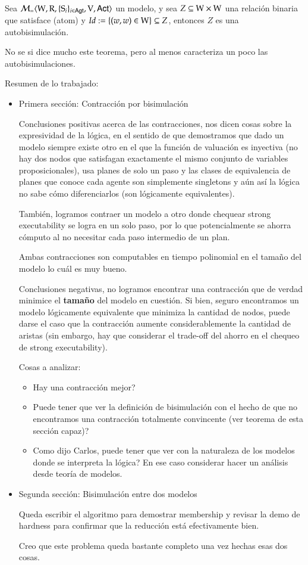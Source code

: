 \begin{teorema}
    Sea $\mathcal{M}_=\langle \mathrm{W},\mathrm{R},\{ \mathrm{S}_i \}_{i \in {\rm \sf Agt}},\mathrm{V},{\rm \sf Act} \rangle$ un modelo, y sea $Z \subseteq \mathrm{W} \times \mathrm{W}$ una relación binaria que satisface (atom) y $Id := \{(w,w)\in \mathrm{W}\} \subseteq Z$, entonces $Z$ es una autobisimulación.
\end{teorema}

No se si dice mucho este teorema, pero al menos caracteriza un poco las autobisimulaciones.

Resumen de lo trabajado:

\begin{itemize}

\item Primera sección: Contracción por bisimulación

Conclusiones positivas acerca de las contracciones, nos dicen cosas sobre la expresividad de la lógica, en el sentido de que demostramos que dado un modelo siempre existe otro en el que la función de valuación es inyectiva (no hay dos nodos que satisfagan exactamente el mismo conjunto de variables proposicionales), usa planes de solo un paso y las clases de equivalencia de planes que conoce cada agente son simplemente singletons y aún así la lógica no sabe cómo diferenciarlos (son lógicamente equivalentes).

También, logramos contraer un modelo a otro donde chequear strong executability se logra en un solo paso, por lo que potencialmente se ahorra cómputo al no necesitar cada paso intermedio de un plan.

Ambas contracciones son computables en tiempo polinomial en el tamaño del modelo lo cuál es muy bueno.


Conclusiones negativas, no logramos encontrar una contracción que de verdad minimice el \rm\textbf{tamaño} del modelo en cuestión. Si bien, seguro encontramos un modelo lógicamente equivalente que minimiza la cantidad de nodos, puede darse el caso que la contracción aumente considerablemente la cantidad de aristas (sin embargo, hay que considerar el trade-off del ahorro en el chequeo de strong executability).

Cosas a analizar: 
\begin{itemize}
    \item Hay una contracción mejor?
    \item Puede tener que ver la definición de bisimulación con el hecho de que no encontramos una contracción totalmente convincente (ver teorema de esta sección capaz)? 
    \item Como dijo Carlos, puede tener que ver con la naturaleza de los modelos donde se interpreta la lógica? En ese caso considerar hacer un análisis desde teoría de modelos.
\end{itemize}


\item Segunda sección: Bisimulación entre dos modelos

Queda escribir el algoritmo para demostrar membership y revisar la demo de hardness para confirmar que la reducción está efectivamente bien.

Creo que este problema queda bastante completo una vez hechas esas dos cosas.

\end{itemize}